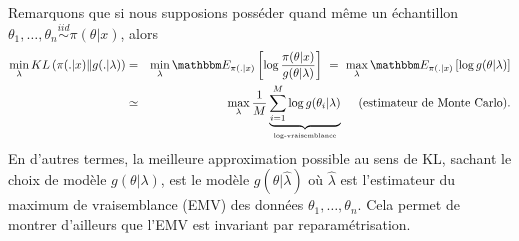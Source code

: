 \begin{remark}
Remarquons que si nous supposions posséder quand même un échantillon $\theta_1,\ldots,\theta_n \overset{iid}{\sim} \pi(\theta|x)$, alors 
\begin{eqnarray*}
\min\limits_{\lambda} KL\left( \pi(.|x) \| g(.|\lambda) \right) & = & \min\limits_{\lambda}  \E_{\pi(.|x)}\left[\log \frac{\pi(\theta|x)}{g(\theta|\lambda)}\right] \ = \  \max\limits_{\lambda} \E_{\pi(.|x)}\left[\log {g(\theta|\lambda)}\right] \\
& \simeq & \max\limits_{\lambda} \frac{1}{M} \underbrace{\sum\limits_{i=1}^M \log {g(\theta_i|\lambda)}}_{\text{\tiny log-vraisemblance}} \ \ \ \ \text{(estimateur de Monte Carlo).} 
\end{eqnarray*}
En d'autres termes, la meilleure approximation possible au sens de KL, sachant le choix de modèle $g(\theta|\lambda)$, est le modèle $g(\theta|\hat{\lambda})$ où $\hat{\lambda}$ est l'estimateur du maximum de vraisemblance (EMV) des données   
$\theta_1,\ldots,\theta_n$.  Cela permet de montrer d'ailleurs que l'EMV est invariant par reparamétrisation. 
\end{remark}

